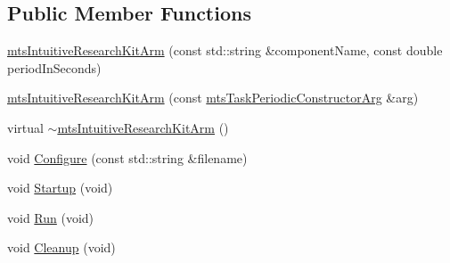 \subsection*{Public Member Functions}
\begin{DoxyCompactItemize}
\item 
\hyperlink{classmts_intuitive_research_kit_arm_a8decc3089690262d5f765448174befdb}{mts\-Intuitive\-Research\-Kit\-Arm} (const std\-::string \&component\-Name, const double period\-In\-Seconds)
\item 
\hyperlink{classmts_intuitive_research_kit_arm_a1a1612a7a6dc75e002b598731741b590}{mts\-Intuitive\-Research\-Kit\-Arm} (const \hyperlink{classmts_task_periodic_constructor_arg}{mts\-Task\-Periodic\-Constructor\-Arg} \&arg)
\item 
virtual \hyperlink{classmts_intuitive_research_kit_arm_a1f3ac4f67e8a147dedff9509fb197d60}{$\sim$mts\-Intuitive\-Research\-Kit\-Arm} ()
\item 
void \hyperlink{classmts_intuitive_research_kit_arm_a0f878813b53d9bd84a00c856d929c4a2}{Configure} (const std\-::string \&filename)
\item 
void \hyperlink{classmts_intuitive_research_kit_arm_aa3638a3cb658b82ccde00bd703e843c6}{Startup} (void)
\item 
void \hyperlink{classmts_intuitive_research_kit_arm_a1694cd44f39f14e0a9d8df7052aa60f1}{Run} (void)
\item 
void \hyperlink{classmts_intuitive_research_kit_arm_a5d63e8f8e3bade35d9aa5d11ccac5123}{Cleanup} (void)
\end{DoxyCompactItemize}
